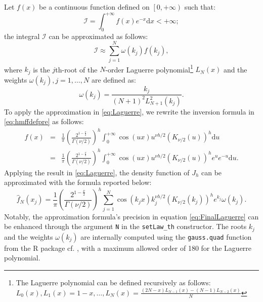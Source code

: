 Let \(f\left(x\right)\) be a continuous function defined on \(\left[0, +\infty\right)\) such that:
\begin{equation*}
\mathcal{I}=\int_0^{+\infty} f\left(x\right) e^{-x}\mbox{d}x<+\infty;
\end{equation*}
the integral \(\mathcal{I}\) can be approximated as follows:
\begin{equation}
\mathcal{I}\approx \sum_{j=1}^{N}\omega\left(k_j\right)f\left(k_{j}\right),
\label{eq:Laguerre}
\end{equation}
where \(k_j\) is the \(j\)th-root of the \(N\)-order Laguerre polynomial\footnote{The Laguerre polynomial can be defined recursively as follows: \(L_0\left(x\right), L_1(x)=1-x, \ldots, L_{N}\left(x\right)=\frac{\left(2N-x\right)L_{N-1}\left(x\right)-\left(N-1\right)L_{N-2}\left(x\right)}{N}\)} \(L_N\left(x\right)\) and the weights \(\omega\left(k_j\right), j=1,\ldots, N\) are defined as:
\begin{equation}
\omega\left(k_{j}\right) = \frac{k_{j}}{\left(N+1\right)^2 L_{N+1}^2\left(k_j\right)}.
\end{equation}
To apply the approximation in \eqref{eq:Laguerre}, we rewrite the inversion formula in \eqref{eq:hmffdefpre} as follows:
\begin{eqnarray}
f\left(x\right)&=&\frac{1}{\pi}\left(\frac{2^{1-\frac{\nu}{2}}}{\Gamma\left(\nu/2\right)}\right)^h\int_{0}^{+\infty}\cos\left(ux\right)u^{\nu h/2}\left(K_{\nu/2}\left(u\right)\right)^h\mbox{d}u\nonumber\\
&=&\frac{1}{\pi}\left(\frac{2^{1-\frac{\nu}{2}}}{\Gamma\left(\nu/2\right)}\right)^h\int_{0}^{+\infty}\cos\left(ux\right)u^{\nu h/2}\left(K_{\nu/2}\left(u\right)\right)^he^{u}e^{-u}\mbox{d}u.
\label{eq:InvForLM}
\end{eqnarray}
Applying the result in \eqref{eq:Laguerre}, the density function of \(J_h\) can be approximated with the formula reported below:
\begin{equation}
\hat{f}_{N}\left(x_j\right) = \frac{1}{\pi}\left(\frac{2^{1-\frac{\nu}{2}}}{\Gamma\left(\nu/2\right)}\right)^h \sum_{j=1}^{N}\cos\left(k_j x\right)k_j^{\nu h/2}\left(K_{\nu/2}\left(k_j\right)\right)^he^{k_j}\omega\left(k_j\right).
\label{eq:FinalLaguerre}
\end{equation}
Notably, the approximation formula's precision in equation \eqref{eq:FinalLaguerre} can be enhanced through the argument \texttt{N} in the \texttt{setLaw\_th} constructor. The roots \(k_j\) and the weights \(\omega\left(k_j\right)\) are internally computed using the \texttt{gauss.quad} function from the R package  cf. \citep{statmod, Goknur2016}, with a maximum allowed order of 180 for the Laguerre polynomial.

